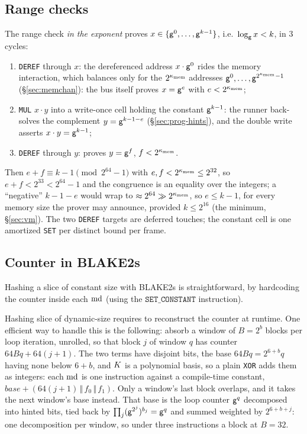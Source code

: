 \subsection{Range checks}\label{sec:prog-range-checks}

The range check \emph{in the exponent} proves $x\in\{\mathsf{g}^{0},\dots,\mathsf{g}^{k-1}\}$, i.e.\ $\log_{\mathsf{g}}x<k$, in 3 cycles:
\begin{enumerate}
\item \texttt{DEREF} through $x$: the dereferenced address $x\cdot\mathsf{g}^{0}$ rides the memory interaction, which balances only for the $2^{\kappa_{\mathrm{mem}}}$ addresses $\mathsf{g}^{0},\dots,\mathsf{g}^{2^{\kappa_{\mathrm{mem}}}-1}$ (\S\ref{sec:memchan}): the bus itself proves $x=\mathsf{g}^{e}$ with $e<2^{\kappa_{\mathrm{mem}}}$;
\item \texttt{MUL} $x\cdot y$ into a write-once cell holding the constant $\mathsf{g}^{k-1}$: the runner back-solves the complement $y=\mathsf{g}^{k-1-e}$ (\S\ref{sec:prog-hints}), and the double write asserts $x\cdot y=\mathsf{g}^{k-1}$;
\item \texttt{DEREF} through $y$: proves $y=\mathsf{g}^{f}$, $f<2^{\kappa_{\mathrm{mem}}}$.
\end{enumerate}
Then $e+f\equiv k-1\pmod{2^{64}-1}$ with $e,f<2^{\kappa_{\mathrm{mem}}}\le2^{32}$, so $e+f<2^{33}<2^{64}-1$ and the congruence is an equality over the integers; a ``negative'' $k-1-e$ would wrap to $\approx2^{64}\gg2^{\kappa_{\mathrm{mem}}}$, so $e\le k-1$, for every memory size the prover may announce, provided $k\le2^{16}$ (the minimum, \S\ref{sec:vm}). The two \texttt{DEREF} targets are deferred touches; the constant cell is one amortized \texttt{SET} per distinct bound per frame.

\subsection{Counter in BLAKE2s}\label{sec:prog-byte-counter}

Hashing a slice of constant size with BLAKE2s is straightforward, by hardcoding the counter inside each $\mathrm{md}$ (using the $\texttt{SET\_CONSTANT}$ instruction).

Hashing slice of dynamic-size requires to reconstruct the counter at runtime. One efficient way to handle this is the following: absorb a window of $B=2^{b}$ blocks per loop iteration, unrolled, so that block $j$ of window $q$ has counter $64Bq+64(j+1)$. The two terms have disjoint bits, the base $64Bq=2^{6+b}q$ having none below $6+b$, and $K$ is a polynomial basis, so a plain \texttt{XOR} adds them as integers: each $\mathrm{md}$ is one instruction against a compile-time constant, $\mathit{base}+(64(j+1)\,\Vert\,f_0\,\Vert\,f_1)$. Only a window's last block overlaps, and it takes the next window's base instead. That base is the loop counter $\mathsf{g}^{q}$ decomposed into hinted bits, tied back by $\prod_j(\mathsf{g}^{2^{j}})^{b_j}=\mathsf{g}^{q}$ and summed weighted by $2^{6+b+j}$: one decomposition per window, so under three instructions a block at $B=32$.


